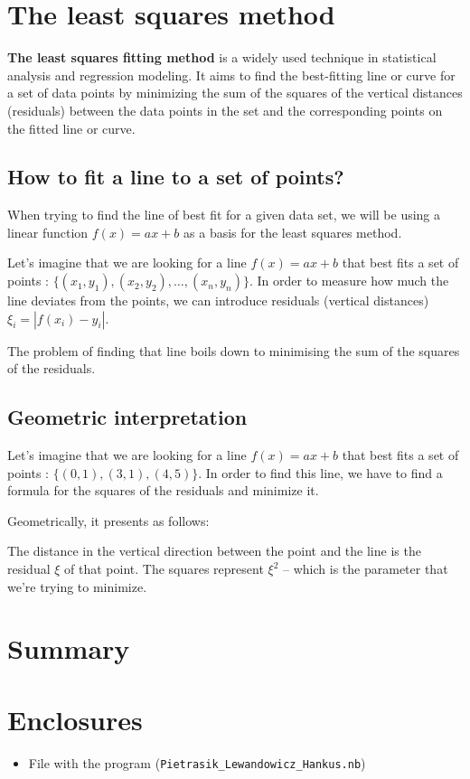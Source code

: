 \documentclass{MathematicaReport}
\begin{document}
\section{The least squares method}
\textbf{The least squares fitting method} is a widely used technique in statistical
analysis and regression modeling. It aims to find the best-fitting line or curve
for a set of data points by minimizing the sum of the squares of the
vertical distances (residuals) between the data points in the set and the
corresponding points on the fitted line or curve. 

\subsection{How to fit a line to a set of points?}
When trying to find the line of best fit for a given data set, we will be using
a linear function \( f(x) = ax + b \)  as a basis for the least squares method.

Let's imagine that we are looking for a line \( f(x) = ax + b \) that best fits 
a set of points : \( \{(x_1,y_1), (x_2,y_2),\ldots,(x_n,y_n)\} \). 
In order to measure how much the line deviates from the points, we can introduce
residuals (vertical distances) \( \xi_i = | f(x_i) - y_i |  \). 

The problem of finding that line boils down to minimising the sum of the 
squares of the residuals.

\subsection{Geometric interpretation}
Let's imagine that we are looking for a line \( f(x) = ax + b \) that best fits 
a set of points : \( \{(0,1), (3,1), (4,5)\} \). In order to find this line,
we have to find a formula for the squares of the residuals and minimize it.

Geometrically, it presents as follows:
\begin{center}
	
\end{center}
The distance in the vertical direction between the point and the line is the 
residual \( \xi \) of that point. The squares represent \( \xi^2 \) -- which is
the parameter that we're trying to minimize.


\section{Summary}

\section*{Enclosures} 
\begin{itemize}
	\item File with the program (\texttt{Pietrasik\_Lewandowicz\_Hankus.nb})
\end{itemize}
\end{document}
